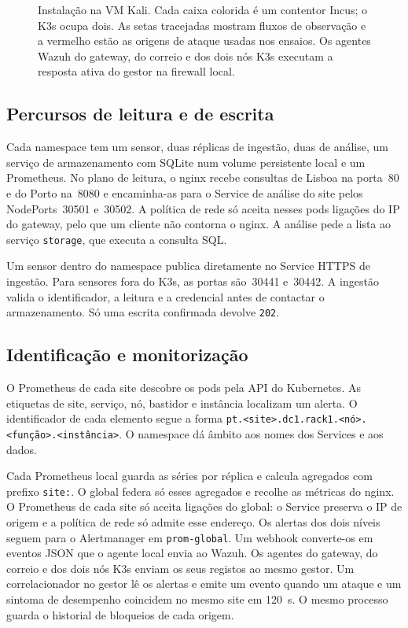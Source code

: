 \documentclass[conference,a4paper]{IEEEtran}
\newcommand{\code}[1]{\texttt{\small #1}}
\begin{document}
\begin{figure}[!t]
\caption{Instalação na VM Kali. Cada caixa colorida é um contentor Incus; o K3s ocupa dois. As setas tracejadas mostram fluxos de observação e a vermelho estão as origens de ataque usadas nos ensaios. Os agentes Wazuh do gateway, do correio e dos dois nós K3s executam a resposta ativa do gestor na firewall local.}
\label{fig:arquitetura}
\end{figure}

\subsection{Percursos de leitura e de escrita}
Cada namespace tem um sensor, duas réplicas de ingestão, duas de análise, um serviço de armazenamento com SQLite num volume persistente local e um Prometheus. No plano de leitura, o nginx recebe consultas de Lisboa na porta~80 e do Porto na~8080 e encaminha-as para o Service de análise do site pelos NodePorts~30501 e~30502. A política de rede só aceita nesses pods ligações do IP do gateway, pelo que um cliente não contorna o nginx. A análise pede a lista ao serviço \code{storage}, que executa a consulta SQL.

Um sensor dentro do namespace publica diretamente no Service HTTPS de ingestão. Para sensores fora do K3s, as portas são~30441 e~30442. A ingestão valida o identificador, a leitura e a credencial antes de contactar o armazenamento. Só uma escrita confirmada devolve \code{202}.

\subsection{Identificação e monitorização}
O Prometheus de cada site descobre os pods pela API do Kubernetes. As etiquetas de site, serviço, nó, bastidor e instância localizam um alerta. O identificador de cada elemento segue a forma \code{pt.<site>.dc1.rack1.<nó>.<função>.<instância>}. O namespace dá âmbito aos nomes dos Services e aos dados.

Cada Prometheus local guarda as séries por réplica e calcula agregados com prefixo \code{site:}. O global federa só esses agregados e recolhe as métricas do nginx. O Prometheus de cada site só aceita ligações do global: o Service preserva o IP de origem e a política de rede só admite esse endereço. Os alertas dos dois níveis seguem para o Alertmanager em \code{prom-global}. Um webhook converte-os em eventos JSON que o agente local envia ao Wazuh. Os agentes do gateway, do correio e dos dois nós K3s enviam os seus registos ao mesmo gestor. Um correlacionador no gestor lê os alertas e emite um evento quando um ataque e um sintoma de desempenho coincidem no mesmo site em 120~s. O mesmo processo guarda o historial de bloqueios de cada origem.
\end{document}
